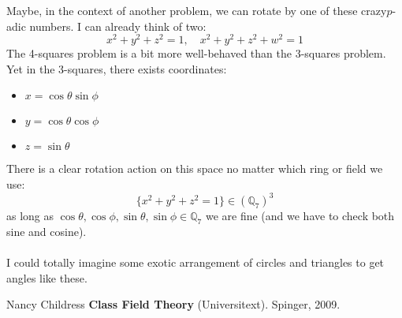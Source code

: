 \documentclass[12pt]{article}
\begin{document}
\newpage

\noindent Maybe, in the context of another problem, we can rotate by one of these crazy$p$-adic numbers.  I can already think of two:
$$ x^2 + y^2 + z^2 = 1, \quad x^2 + y^2 + z^2 + w^2 = 1$$
The 4-squares problem is a bit more well-behaved than the 3-squares problem.  Yet in the 3-squares, there exists coordinates:
\begin{itemize}
\item $ x = \cos \theta \sin \phi $
\item $ y = \cos \theta \cos \phi $
\item $ z = \sin \theta $
\end{itemize}
There is a clear rotation action on this space no matter which ring or field we use:
$$ \big\{ x^2 + y^2 + z^2  = 1 \big\}  \in (\mathbb{Q}_7)^3 $$
as long as $ \cos \theta, \cos \phi, \sin \theta, \sin \phi \in \mathbb{Q}_7$ we are fine (and we have to check both sine and cosine).   \\ \\
I could totally imagine some exotic arrangement of circles and triangles to get angles like these.

\vfill

\begin{thebibliography}{}

\item Nancy Childress \textbf{Class Field Theory} (Universitext).  Spinger, 2009.

\end{thebibliography}
\end{document}
